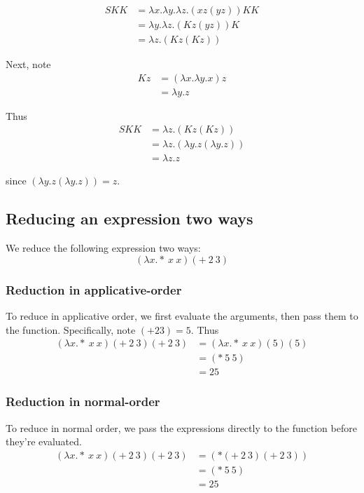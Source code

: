 \documentclass[paper=a4, fontsize=11pt]{scrartcl} %
\numberwithin{equation}{section} %
\numberwithin{figure}{section} %
\numberwithin{table}{section} %
\begin{document}
\begin{align*}
SKK &=  \lambda x.\lambda y .\lambda z .(xz(yz)) K K \\
	&= \lambda y .\lambda z .(Kz(yz)) K \\
	&= \lambda z .(Kz(Kz))
\end{align*}

Next, note
\begin{align*}
Kz &= (\lambda x.\lambda y. x) z \\
	&= \lambda y. z
\end{align*}

Thus
\begin{align*}
SKK &= \lambda z .(Kz(Kz)) \\
	&= \lambda z .\left(\lambda y. z (\lambda y. z) \right) \\
	&= \lambda z . z
\end{align*}

since $\left(\lambda y. z (\lambda y. z) \right) = z$.

\subsection{Reducing an expression two ways}

We reduce the following expression two ways:
\[(\lambda x. *~x~x ) (+~2~3)\]

\subsubsection{Reduction in applicative-order}

To reduce in applicative order, we first evaluate the arguments, then pass them to the function. Specifically, note $( + 2 3) = 5$. Thus
\begin{align*}
(\lambda x. *~x~x ) (+~2~3) (+~2~3) &= (\lambda x. *~x~x ) (5) (5) \\
	&= (*~5~5 )\\
	&= 25
\end{align*}

\subsubsection{Reduction in normal-order}

To reduce in normal order, we pass the expressions directly to the function before they're evaluated. 
\begin{align*}
(\lambda x. *~x~x ) (+~2~3) (+~2~3) &= (*(+~2~3)  (+~2~3) )  \\
	&= (*~5~5 )\\
	&= 25
\end{align*}
\end{document}
